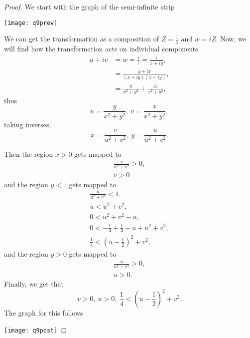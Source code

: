 \documentclass{article}
\begin{document}
\begin{proof}
    We start with the graph of the semi-infinite strip

    \texttt{[image: q9prev]}

    We can get the transformation as a composition of $Z = \frac{1}{z}$ and
    $w = iZ$. Now, we will find how the transformation acts on individual components
    \begin{align*}
        u + iv & = w = \frac{i }{z} = \frac{i }{x + iy},       \\
               & = \frac{y + ix}{(x + iy)(x-iy)},              \\
               & = \frac{y}{x^2 + y^2} + \frac{ix}{x^2 + y^2},
    \end{align*}
    thus
    \begin{equation*}
        u = \frac{y}{x^2+ y^2}, \ v = \frac{x}{x^2 + y^2},
    \end{equation*}
    taking inverses,
    \begin{equation*}
        x = \frac{v }{u^2 + v^2}, \ y = \frac{u }{u^2 + v^2}.
    \end{equation*}

    Then the region $x > 0$ gets mapped to
    \begin{gather*}
        \frac{v }{u^2 + v^2} > 0,\\
        v > 0
    \end{gather*}
    and the region $y < 1$ gets mapped to
    \begin{gather*}
        \frac{u }{u^2 + v^2} < 1,\\
        u < u^2 + v^2,\\
        0 < u^2 + v^2 - u,\\
        0 < -\frac{1}{4} + \frac{1}{4} - u + u^2 + v^2,\\
        \frac{1}{4} < (u - \frac{1}{2})^2 + v^2,
    \end{gather*}
    and the region $y > 0$ gets mapped to
    \begin{gather*}
        \frac{u }{u^2 + v^2} > 0,\\
        u > 0.
    \end{gather*}
    Finally, we get that
    \begin{equation*}
        v > 0, \ u > 0, \ \frac{1}{4} < (u - \frac{1}{2})^2 + v^2.
    \end{equation*}
    The graph for this follows

    \texttt{[image: q9post]}

\end{proof}
\end{document}
